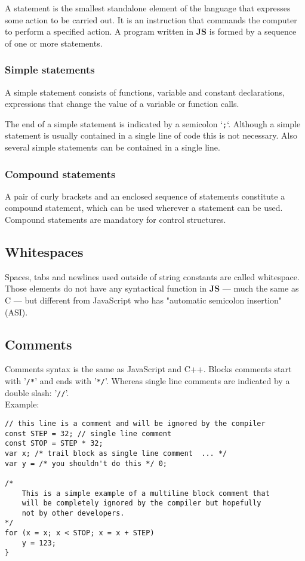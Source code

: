 A statement is the smallest standalone element of the language that expresses some action to be carried out. It is an instruction that commands the computer to perform a specified action. A program written in \textbf{\textmu JS} is formed by a sequence of one or more statements. 

\subsubsection{Simple statements}

A simple statement consists of functions, variable and constant declarations, expressions that change the value of a variable or function calls. 

The end of a simple statement is indicated by a semicolon `\texttt{;}`. Although a simple statement is usually contained in a single line of code this is not necessary. Also several simple statements can be contained in a single line.

\subsubsection{Compound statements}

A pair of curly brackets \textbf{{ }} and an enclosed sequence of statements constitute a compound statement, which can be used wherever a statement can be used. Compound statements are mandatory for control structures.

\subsection{Whitespaces}

Spaces, tabs and newlines used outside of string constants are called whitespace. Those elements do not have any syntactical function in \textbf{\textmu JS} --- much the same as C --- but different from JavaScript who has "automatic semicolon insertion" (ASI).

\subsection {Comments}

Comments syntax is the same as JavaScript and C++. Blocks comments start with '\texttt{/*}' and ends with '\texttt{*/}'. Whereas single line comments are indicated by a double slash: '\texttt{//}'.\\

Example:
\begin{lstlisting}[language=uJS]
// this line is a comment and will be ignored by the compiler
const STEP = 32; // single line comment
const STOP = STEP * 32; 
var x; /* trail block as single line comment  ... */
var y = /* you shouldn't do this */ 0; 

/* 
	This is a simple example of a multiline block comment that
	will be completely ignored by the compiler but hopefully
	not by other developers.
*/
for (x = x; x < STOP; x = x + STEP)
	y = 123;
}

\end{lstlisting}
